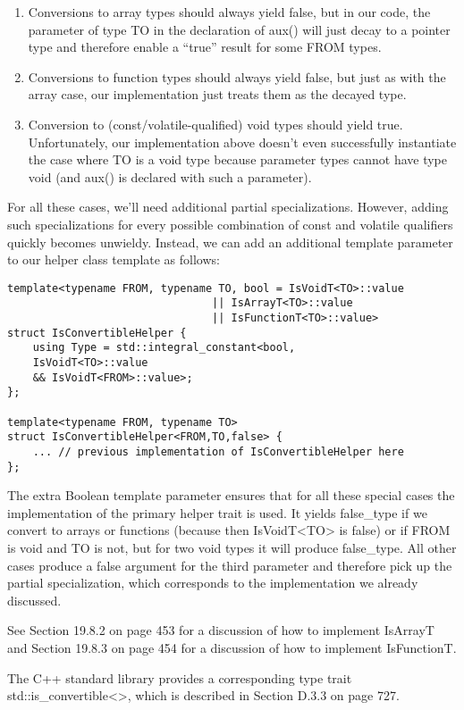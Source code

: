 \begin{enumerate}
\item
Conversions to array types should always yield false, but in our code, the parameter of type TO in the declaration of aux() will just decay to a pointer type and therefore enable a “true” result for some FROM types.

\item
Conversions to function types should always yield false, but just as with the array case, our implementation just treats them as the decayed type.

\item
Conversion to (const/volatile-qualified) void types should yield true. Unfortunately, our implementation above doesn’t even successfully instantiate the case where TO is a void type because parameter types cannot have type void (and aux() is declared with such a parameter).
\end{enumerate}

For all these cases, we’ll need additional partial specializations. However, adding such specializations for every possible combination of const and volatile qualifiers quickly becomes unwieldy. Instead, we can add an additional template parameter to our helper class template as follows:

\begin{lstlisting}[style=styleCXX]
template<typename FROM, typename TO, bool = IsVoidT<TO>::value
								|| IsArrayT<TO>::value
								|| IsFunctionT<TO>::value>
struct IsConvertibleHelper {
	using Type = std::integral_constant<bool,
	IsVoidT<TO>::value
	&& IsVoidT<FROM>::value>;
};

template<typename FROM, typename TO>
struct IsConvertibleHelper<FROM,TO,false> {
	... // previous implementation of IsConvertibleHelper here
};
\end{lstlisting}

The extra Boolean template parameter ensures that for all these special cases the implementation of the primary helper trait is used. It yields false\_type if we convert to arrays or functions (because then IsVoidT<TO> is false) or if FROM is void and TO is not, but for two void types it will produce false\_type. All other cases produce a false argument for the third parameter and therefore pick up the partial specialization, which corresponds to the implementation we already discussed.

See Section 19.8.2 on page 453 for a discussion of how to implement IsArrayT and Section 19.8.3 on page 454 for a discussion of how to implement IsFunctionT.

The C++ standard library provides a corresponding type trait std::is\_convertible<>, which is described in Section D.3.3 on page 727.



